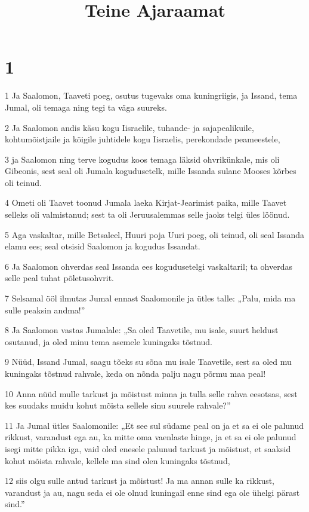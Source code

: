

\title{Teine Ajaraamat}

\chapter{1}

\par 1 Ja Saalomon, Taaveti poeg, osutus tugevaks oma kuningriigis, ja Issand, tema Jumal, oli temaga ning tegi ta väga suureks.
\par 2 Ja Saalomon andis käsu kogu Iisraelile, tuhande- ja sajapealikuile, kohtumõistjaile ja kõigile juhtidele kogu Iisraelis, perekondade peameestele,
\par 3 ja Saalomon ning terve kogudus koos temaga läksid ohvrikünkale, mis oli Gibeonis, sest seal oli Jumala kogudusetelk, mille Issanda sulane Mooses kõrbes oli teinud.
\par 4 Ometi oli Taavet toonud Jumala laeka Kirjat-Jearimist paika, mille Taavet selleks oli valmistanud; sest ta oli Jeruusalemmas selle jaoks telgi üles löönud.
\par 5 Aga vaskaltar, mille Betsaleel, Huuri poja Uuri poeg, oli teinud, oli seal Issanda elamu ees; seal otsisid Saalomon ja kogudus Issandat.
\par 6 Ja Saalomon ohverdas seal Issanda ees kogudusetelgi vaskaltaril; ta ohverdas selle peal tuhat põletusohvrit.
\par 7 Selsamal ööl ilmutas Jumal ennast Saalomonile ja ütles talle: „Palu, mida ma sulle peaksin andma!”
\par 8 Ja Saalomon vastas Jumalale: „Sa oled Taavetile, mu isale, suurt heldust osutanud, ja oled minu tema asemele kuningaks tõstnud.
\par 9 Nüüd, Issand Jumal, saagu tõeks su sõna mu isale Taavetile, sest sa oled mu kuningaks tõstnud rahvale, keda on nõnda palju nagu põrmu maa peal!
\par 10 Anna nüüd mulle tarkust ja mõistust minna ja tulla selle rahva eesotsas, sest kes suudaks muidu kohut mõista sellele sinu suurele rahvale?”
\par 11 Ja Jumal ütles Saalomonile: „Et see sul südame peal on ja et sa ei ole palunud rikkust, varandust ega au, ka mitte oma vaenlaste hinge, ja et sa ei ole palunud isegi mitte pikka iga, vaid oled enesele palunud tarkust ja mõistust, et saaksid kohut mõista rahvale, kellele ma sind olen kuningaks tõstnud,
\par 12 siis olgu sulle antud tarkust ja mõistust! Ja ma annan sulle ka rikkust, varandust ja au, nagu seda ei ole olnud kuningail enne sind ega ole ühelgi pärast sind.”
